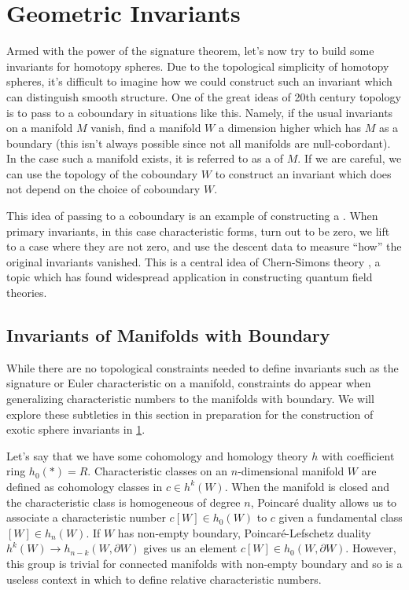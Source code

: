 \pagebreak
\section{Geometric Invariants}\label{sec:invariants-for-homotopy-4k-1-spheres}

Armed with the power of the signature theorem, let's now try to build some invariants for homotopy spheres.
Due to the topological simplicity of homotopy spheres, it's difficult to imagine how we could construct such an invariant which can distinguish smooth structure. One of the great ideas of 20th century topology is to pass to a coboundary in situations like this. Namely, if the usual invariants on a manifold $M$ vanish, find a manifold $W$ a dimension higher which has $M$ as a boundary (this isn't always possible since not all manifolds are null-cobordant).
In the case such a manifold exists, it is referred to as a  of $M$. If we are careful, we can use the topology of the coboundary $W$ to construct an invariant which does not depend on the choice of coboundary $W$.

\begin{remark}
	This idea of passing to a coboundary is an example of constructing a . When primary invariants, in this case characteristic forms, turn out to be zero, we lift to a case where they are not zero, and use the descent data to measure ``how'' the original invariants vanished. This is a central idea of Chern-Simons theory \cite{chernsimons1974geometric}, a topic which has found widespread application in constructing quantum field theories.
\end{remark}

\subsection{Invariants of Manifolds with Boundary}\label{sec:relative-invariants}

While there are no topological constraints needed to define invariants such as the signature or Euler characteristic on a manifold, constraints do appear when generalizing characteristic numbers to the manifolds with boundary. We will explore these subtleties in this section in preparation for the construction of exotic sphere invariants in \cref{sec:invariants-for-homotopy-4k-1-spheres}.

Let's say that we have some cohomology and homology theory $h$ with coefficient ring $h_0(*)=R$.
Characteristic classes on an $n$-dimensional manifold $W$ are defined as cohomology classes in $c\in h^k(W)$. When the manifold is closed and the characteristic class is homogeneous of degree $n$, Poincar\'e duality allows us to associate a characteristic number $c[W]\in h_0(W)$ to $c$ given a fundamental class $[W]\in h_n(W)$. If $W$ has non-empty boundary, Poincar\'e-Lefschetz duality $h^k(W)\to h_{n-k}(W,\partial W)$ gives us an element $c[W]\in h_0(W,\partial W)$. However, this group is trivial for connected manifolds with non-empty boundary and so is a useless context in which to define relative characteristic numbers.

